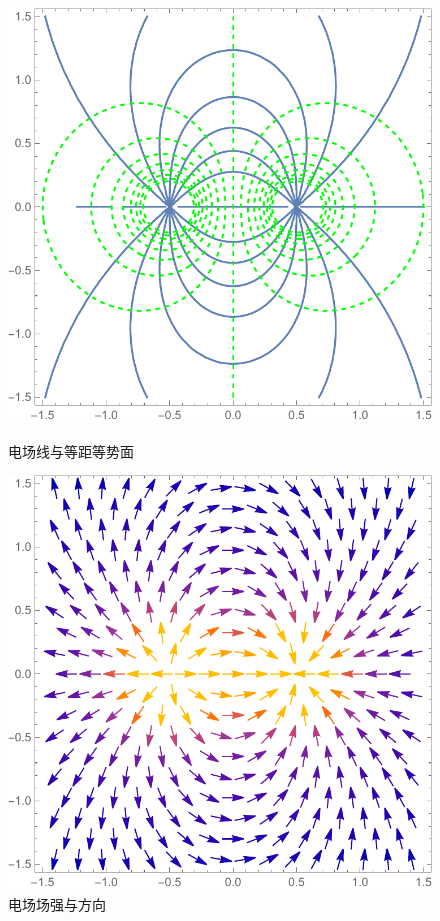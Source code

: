 \begin{figure}[H]
\begin{minipage}[b]{0.4\linewidth}
\centering
\includegraphics[width=\textwidth]{pic_data/Y/dlyzdh_p1.pdf}
\caption{电场线与等距等势面}
\end{minipage}
\hfill
\begin{minipage}[b]{0.4\linewidth}
\centering
\includegraphics[width=\textwidth]{pic_data/Y/dlyzdh_p2.pdf}
\caption{电场场强与方向}
\end{minipage}
\end{figure}


